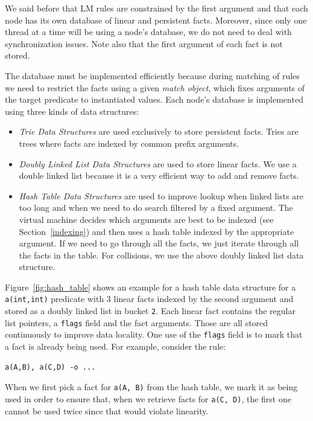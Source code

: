 \documentclass{sigplanconf}
\begin{document}
We said before that LM rules are constrained by the first argument and
that each node has its own database of linear and persistent
facts. Moreover, since only one thread at a time will be using a
node's database, we do not need to deal with synchronization
issues. Note also that the first argument of each fact is not stored.

The database must be implemented efficiently because during matching
of rules we need to restrict the facts using a given \emph{match
object}, which fixes arguments of the target predicate to instantiated
values. Each node's database is implemented using three kinds of data
structures:

\begin{itemize}
\item \emph{Trie Data Structures} are used exclusively to store 
  persistent facts. Tries are trees where facts are indexed by common
  prefix arguments.
\item \emph{Doubly Linked List Data Structures} are used to store 
  linear facts. We use a double linked list because it is a very
   efficient way to add and remove facts.
\item \emph{Hash Table Data Structures} are used to improve lookup when 
  linked lists are too long and when we need to do search filtered by
  a fixed argument. The virtual machine decides which arguments are
  best to be indexed (see Section~\ref{indexing}) and then uses a hash table
  indexed by the appropriate argument. If we need to go through all
  the facts, we just iterate through all the facts in the table. For
  collisions, we use the above doubly linked list data structure.
\end{itemize}

Figure~\ref{fig:hash_table} shows an example for a hash table data
structure for a \texttt{a(int,int)} predicate with 3 linear facts
indexed by the second argument and stored as a doubly linked list in
bucket \texttt{2}. Each linear fact contains the regular list
pointers, a \texttt{flags} field and the fact arguments. Those are all
stored continuously to improve data locality. One use of
the \texttt{flags} field is to mark that a fact is already being
used. For example, consider the rule:

{\footnotesize
\begin{Verbatim}
a(A,B), a(C,D) -o ...
\end{Verbatim}
}

When we first pick a fact for \texttt{a(A, B)} from the hash
table, we mark it as being used in order to ensure that, when we
retrieve facts for \texttt{a(C, D)}, the first one cannot be used
twice since that would violate linearity.
\end{document}
